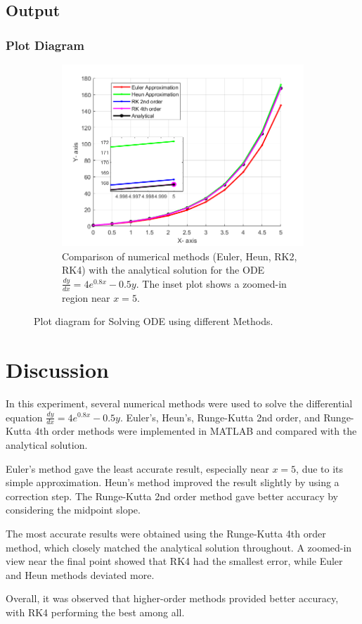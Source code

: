 \documentclass[a4paper,12pt]{article}
\begin{document}
	
	
	\subsection{Output}
	
	
	\subsubsection{Plot Diagram}
	\begin{figure}[H]
		\centering
	
		\begin{subfigure}[t]{1\textwidth}
			\centering
				\includegraphics[width=0.81\linewidth]{Images/3}
			\caption{Comparison of numerical methods (Euler, Heun, RK2, RK4) with the analytical solution for the ODE \(\frac{dy}{dx} = 4e^{0.8x} - 0.5y\). The inset plot shows a zoomed-in region near \(x = 5\).}
		\end{subfigure}
		
	\caption{Plot diagram for Solving ODE using different Methods.}
	
	\end{figure}
	\newpage
	\section{Discussion}
	
	In this experiment, several numerical methods were used to solve the differential equation \(\frac{dy}{dx} = 4e^{0.8x} - 0.5y\). Euler’s, Heun’s, Runge-Kutta 2nd order, and Runge-Kutta 4th order methods were implemented in MATLAB and compared with the analytical solution.
	
	Euler’s method gave the least accurate result, especially near \(x = 5\), due to its simple approximation. Heun’s method improved the result slightly by using a correction step. The Runge-Kutta 2nd order method gave better accuracy by considering the midpoint slope.
	
	The most accurate results were obtained using the Runge-Kutta 4th order method, which closely matched the analytical solution throughout. A zoomed-in view near the final point showed that RK4 had the smallest error, while Euler and Heun methods deviated more.
	
	Overall, it was observed that higher-order methods provided better accuracy, with RK4 performing the best among all.
	
\end{document}
